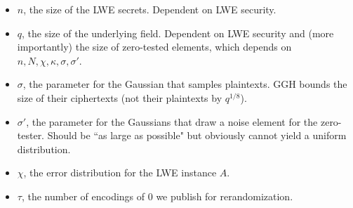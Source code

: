 \begin{itemize}
\item $n$, the size of the LWE secrets.  Dependent on LWE security.
\item $q$, the size of the underlying field.  Dependent on LWE security and (more importantly) the size of zero-tested elements, which depends on $n, N, \chi, \kappa, \sigma, \sigma'$.
\item $\sigma$, the parameter for the Gaussian that samples plaintexts.  GGH bounds the size of their ciphertexts (not their plaintexts by $q^{1/8}$).
\item $\sigma'$, the parameter for the Gaussians that draw a noise element for the zero-tester.  Should be ``as large as possible" but obviously cannot yield a uniform distribution.
\item $\chi$, the error distribution for the LWE instance $A$.
\item $\tau$, the number of encodings of $0$ we publish for rerandomization.
\end{itemize}


